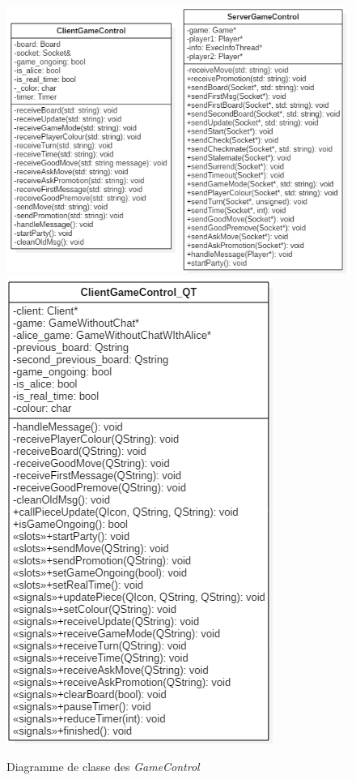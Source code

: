\documentclass[10pt, a4paper]{article}
\begin{document}
\begin{figure}[H]
\centering
\includegraphics[scale=0.72]{client_server_control.png}
\includegraphics[scale=0.72]{diagram_clientgamecontrolqt.png}
\caption{Diagramme de classe des \textit{GameControl}}
\end{figure}
\end{document}
